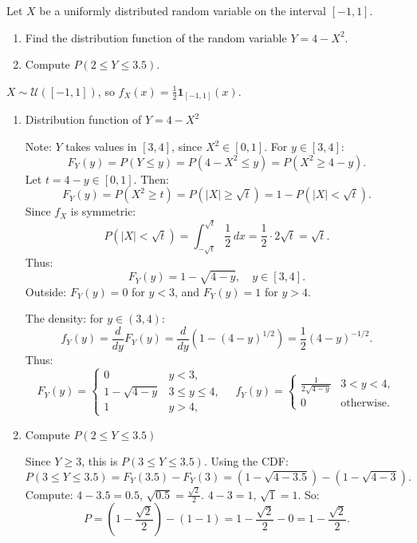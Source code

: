\documentclass[12pt]{article}
\begin{document}
\section{}
Let \( X \) be a uniformly distributed random variable on the interval \([-1, 1]\).

\begin{enumerate}
    \item Find the distribution function of the random variable \( Y = 4-X^2 \).
    \item Compute \( P(2 \leq Y \leq 3.5) \).
\end{enumerate}

\begin{answerbox}
\( X \sim \mathcal{U}([-1,1]) \), so \( f_X(x) = \frac{1}{2} \mathbf{1}_{[-1,1]}(x) \).

\begin{enumerate}
  \item Distribution function of \( Y = 4 - X^2 \)

  Note: \( Y \) takes values in \([3, 4]\), since \( X^2 \in [0,1] \). For \( y \in [3,4] \):
\[
F_Y(y) = P(Y \le y) = P(4 - X^2 \le y) = P(X^2 \ge 4 - y).
\]
Let \( t = 4 - y \in [0,1] \). Then:
\[
F_Y(y) = P(X^2 \ge t) = P(|X| \ge \sqrt{t}) = 1 - P(|X| < \sqrt{t}).
\]
Since \( f_X \) is symmetric:
\[
P(|X| < \sqrt{t}) = \int_{-\sqrt{t}}^{\sqrt{t}} \frac{1}{2} \, dx = \frac{1}{2} \cdot 2\sqrt{t} = \sqrt{t}.
\]
Thus:
\[
F_Y(y) = 1 - \sqrt{4 - y}, \quad y \in [3,4].
\]
Outside: \( F_Y(y) = 0 \) for \( y < 3 \), and \( F_Y(y) = 1 \) for \( y > 4 \).

The density: for \( y \in (3,4) \):
\[
f_Y(y) = \frac{d}{dy} F_Y(y) = \frac{d}{dy} \left( 1 - (4-y)^{1/2} \right) = \frac{1}{2} (4-y)^{-1/2}.
\]
Thus:
\[
F_Y(y) = 
\begin{cases}
0 & y < 3, \\
1 - \sqrt{4-y} & 3 \le y \le 4, \\
1 & y > 4,
\end{cases}
\quad
f_Y(y) = 
\begin{cases}
\frac{1}{2\sqrt{4-y}} & 3 < y < 4, \\
0 & \text{otherwise}.
\end{cases}
\]

  \item Compute \( P(2 \le Y \le 3.5) \)

  Since \( Y \ge 3 \), this is \( P(3 \le Y \le 3.5) \). Using the CDF:
\[
P(3 \le Y \le 3.5) = F_Y(3.5) - F_Y(3) = \left(1 - \sqrt{4 - 3.5}\right) - \left(1 - \sqrt{4-3}\right).
\]
Compute: \( 4 - 3.5 = 0.5 \), \( \sqrt{0.5} = \frac{\sqrt{2}}{2} \). \( 4 - 3 = 1 \), \( \sqrt{1} = 1 \).  
So:
\[
P = \left(1 - \frac{\sqrt{2}}{2}\right) - (1 - 1) = 1 - \frac{\sqrt{2}}{2} - 0 = 1 - \frac{\sqrt{2}}{2}.
\]
\end{enumerate}
\end{answerbox}

\end{document}
